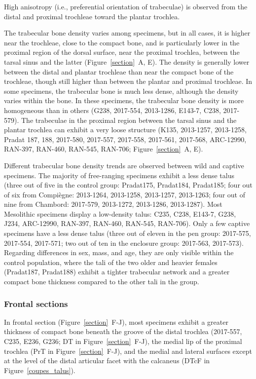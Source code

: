 \documentclass[12pt,a4paper]{article}
\begin{document}
High anisotropy (i.e., preferential orientation of trabeculae) is observed from the distal and proximal trochleae toward the plantar trochlea.

The trabecular bone density varies among specimens, but in all cases, it is higher near the trochleae, close to the compact bone, and is particularly lower in the proximal region of the dorsal surface, near the proximal trochlea, between the tarsal sinus and the latter (Figure~\ref{section}~A, E). The density is generally lower between the distal and plantar trochleae than near the compact bone of the trochleae, though still higher than between the plantar and proximal trochleae. In some specimens, the trabecular bone is much less dense, although the density varies within the bone. In these specimens, the trabecular bone density is more homogeneous than in others (G238, 2017-554, 2013-1286, E143-7, C238, 2017-579). The trabeculae in the proximal region between the tarsal sinus and the plantar trochlea can exhibit a very loose structure (K135, 2013-1257, 2013-1258, Pradat 187, 188, 2017-580, 2017-557, 2017-558, 2017-561, 2017-568, ARC-12990, RAN-397, RAN-460, RAN-545, RAN-706; Figure~\ref{section}~A, E).

Different trabecular bone density trends are observed between wild and captive specimens. The majority of free-ranging specimens exhibit a less dense talus (three out of five in the control group: Pradat175, Pradat184, Pradat185; four out of six from Compiègne: 2013-1264, 2013-1258, 2013-1257, 2013-1263; four out of nine from Chambord: 2017-579, 2013-1272, 2013-1286, 2013-1287). Most Mesolithic specimens display a low-density talus: C235, C238, E143-7, G238, J234, ARC-12990, RAN-397, RAN-460, RAN-545, RAN-706). Only a few captive specimens have a less dense talus (three out of eleven in the pen group: 2017-575, 2017-554, 2017-571; two out of ten in the enclosure group: 2017-563, 2017-573). Regarding differences in sex, mass, and age, they are only visible within the control population, where the tali of the two older and heavier females (Pradat187, Pradat188) exhibit a tighter trabecular network and a greater compact bone thickness compared to the other tali in the group.

\subsubsection{Frontal sections}
In frontal section (Figure~\ref{section}~F-J), most specimens exhibit a greater thickness of compact bone beneath the groove of the distal trochlea (2017-557, C235, E236, G236; DT in Figure~\ref{section}~F-J), the medial lip of the proximal trochlea (PrT in Figure~\ref{section}~F-J), and the medial and lateral surfaces except at the level of the distal articular facet with the calcaneus (DTcF in Figure~\ref{coupes_talus}).
\end{document}
